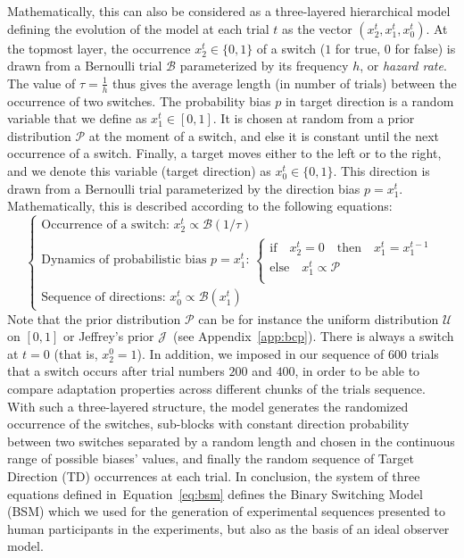 \documentclass[12pt,english]{article}%
\newcommand{\choice}[1]{ %
	\left\{ %
		\begin{array}{l} #1 \end{array} %
	\right. }
\newcommand{\eql}[1]{\begin{equation}#1\end{equation}}
\newcommand{\Bb}{\mathcal{B}}
\newcommand{\Jj}{\mathcal{J}}
\newcommand{\Pp}{\mathcal{P}}
\newcommand{\Uu}{\mathcal{U}}
\newcommand{\seeFig}[1]{Figure~\ref{fig:#1}}
\newcommand{\seeEq}[1]{Equation~\ref{eq:#1}}
\newcommand{\seeApp}[1]{Appendix~\ref{app:#1}}
\begin{document}
Mathematically, this can also be considered as a three-layered hierarchical model
defining the evolution of the model at each trial $t$ as the vector  $(x_2^t, x_1^t, x_0^t)$.
At the topmost layer,
the occurrence $x_2^t \in \{ 0, 1 \}$ of a switch ($1$ for true, $0$ for false)
is  drawn from a Bernoulli trial $\Bb$ parameterized by its frequency $h$, or \emph{hazard rate}.
The value of $\tau=\frac 1 h$ thus gives the average length (in number of trials)
between the occurrence of two switches.
The probability bias $p$ in target direction is a random variable that we define as $x_1^t \in [0, 1]$.
It is chosen at random from a prior distribution $\Pp$ at the moment of a switch,
and else it is constant until the next occurrence of a switch.
Finally, a target moves either to the left or to the right,
and we denote this variable (target direction) as $x_0^t \in \{ 0, 1 \}$.
This direction is drawn from a Bernoulli trial
parameterized by the direction bias $p=x_1^t$.
Mathematically, this is  described according to the following equations:
 \eql{\choice{
\text{Occurrence of a switch: } x_2^t \propto \Bb(1/\tau) \\
\text{Dynamics of probabilistic bias $p=x_1^t$: } 
 \choice{\text{if} \quad x_2^t=0 \quad \text{then} \quad  x_1^t = x_1^{t-1} \\
 \text{else} \quad x_1^t \propto \Pp  \\
 } \\
\text{Sequence of directions: } x_0^t \propto \Bb(x_1^t)
 }\label{eq:bsm}}
Note that the prior distribution $\Pp$ can be for instance
the uniform distribution $\Uu$ on $ [ 0, 1 ] $ or
Jeffrey's prior $\Jj$~(see \seeApp{bcp}).
There is always a switch at $t=0$ (that is, $x_2^0=1$). 
In addition, we imposed in our sequence of $600$ trials that a switch 
occurs after trial numbers $200$ and $400$, 
in order to be able to compare adaptation properties across different chunks of the trials sequence.
With such a three-layered structure, the model generates the randomized occurrence of the switches,
sub-blocks with constant direction probability between two switches separated by a random length
and chosen in the continuous range of possible biases' values,
and finally the random sequence of Target Direction (TD) occurrences at each trial.
In conclusion, the system of three equations defined in~\seeEq{bsm}
defines the Binary Switching Model (BSM)
which we used for the generation of experimental sequences presented to human participants in the experiments,
but also as the basis of an ideal observer model.
\end{document}
